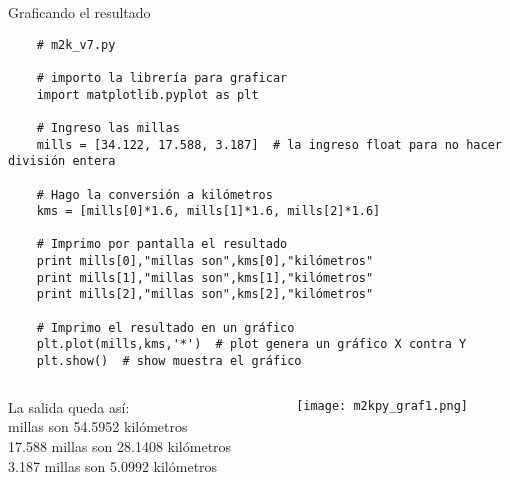 \documentclass[9pt]{beamer}
\begin{document}
\begin{frame}[fragile]{Graficando el resultado}
\footnotesize{\begin{verbatim}
	# m2k_v7.py
	
	# importo la librería para graficar
	import matplotlib.pyplot as plt
	
	# Ingreso las millas
	mills = [34.122, 17.588, 3.187]  # la ingreso float para no hacer división entera
	
	# Hago la conversión a kilómetros
	kms = [mills[0]*1.6, mills[1]*1.6, mills[2]*1.6] 
	
	# Imprimo por pantalla el resultado
	print mills[0],"millas son",kms[0],"kilómetros"
	print mills[1],"millas son",kms[1],"kilómetros"
	print mills[2],"millas son",kms[2],"kilómetros"
	
	# Imprimo el resultado en un gráfico
	plt.plot(mills,kms,'*')  # plot genera un gráfico X contra Y
	plt.show()  # show muestra el gráfico
	\end{verbatim}}\pause
\begin{columns}
	\begin{column}{0.5\textwidth}
		La salida queda así:\\
		\vspace{.5cm}
		 millas son 54.5952 kilómetros\\
		17.588 millas son 28.1408 kilómetros\\
		3.187 millas son 5.0992 kilómetros
	\end{column}
	\begin{column}{0.5\textwidth}  %
		\begin{center}
			\texttt{[image: m2kpy\_graf1.png]}
		\end{center}
	\end{column}
\end{columns}
\end{frame}
\end{document}
